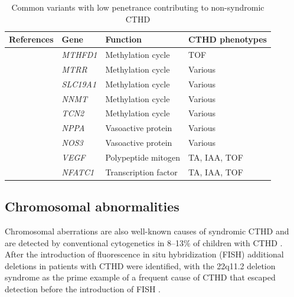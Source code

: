 \begin{refsection}
\begin{table}[!tb]
\centering
\caption{Common variants with low penetrance contributing to non-syndromic CTHD \cite{wessels2010genetic}}
\label{tab:1_1}

\begin{tabular}{  l  l  l  l  }
\hline
	References & Gene  & Function & CTHD phenotypes \\ \hline
	\cite{christensen2009mthfd1} & \textit{MTHFD1} & Methylation cycle & TOF \\ \hline
	\cite{van2006mtrr} & \textit{MTRR} & Methylation cycle & Various \\ \hline
	\cite{pei2006genetic} & \textit{SLC19A1} & Methylation cycle & Various \\ \hline
	\cite{van2008eight} & \textit{NNMT} & Methylation cycle & Various \\ \hline
	\cite{verkleij2008genetic} & \textit{TCN2} & Methylation cycle & Various \\ \hline
	\cite{shaw2005risks} & \textit{NPPA} & Vasoactive protein & Various \\ \hline
	\cite{lambrechts2005low} & \textit{NOS3} & Vasoactive protein & Various \\ \hline
	\cite{lambrechts2005low,stalmans2003vegf} & \textit{VEGF} & Polypeptide mitogen & TA, IAA, TOF \\ \hline
	\cite{varmuza2006differential} & \textit{NFATC1} & Transcription factor & TA, IAA, TOF \\ \hline
\end{tabular}
\end{table}


\subsection{Chromosomal abnormalities}

Chromosomal aberrations are also well-known causes of syndromic CTHD and are detected by conventional cytogenetics in 8–13\% of children with CTHD \cite{ferencz1989congenital}. After the introduction of fluorescence in situ hybridization (FISH) additional deletions in patients with CTHD were identified, with the 22q11.2 deletion syndrome as the prime example of a frequent cause of CTHD that escaped detection before the introduction of FISH \cite{thienpont2007submicroscopic}.


\end{refsection}
